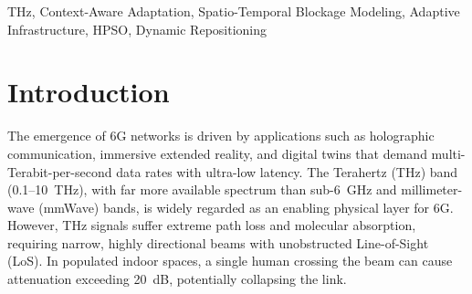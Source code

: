 \documentclass[conference]{IEEEtran}
\begin{document}
	\begin{abstract}
		The Terahertz (THz) band promises high-speed indoor
		connectivity for 6G, but its dependence on line-of-sight
		makes it highly vulnerable to dynamic blockages. Traditional indoor deployments rely on static Access Points (APs) and cannot adapt when physical obstructions arise
		or crowd patterns shift, leading to low coverage. In this
		paper, we present TeraMove, a blockage-aware framework that
		uses spatial human-density context to detect THz link degradation
		from dynamic blockages and adapt the AP configuration to restore
		pervasive connectivity. We describe how this context can be obtained from 3D LiDAR depth sensing; our evaluation uses an empirical pedestrian density model.
		TeraMove first establishes an optimal baseline layout for AP placement using a Mixed Integer Linear Programming (MILP) model over 3D
		coordinates and beam orientations, then employs a four-tier optimization that escalates from electronic beam steering to full 3D
		node repositioning, performing physical movement only when lighter
		adaptations prove insufficient to provide threshold coverage.
		Evaluations in a realistic indoor environment show that crowd-induced
		blockages can reduce coverage to 16.6\%; our algorithm recovers it
		to over 95\% while requiring 84.6\% less physical displacement than
		the alternative approaches evaluated.
	\end{abstract}
	
	\begin{IEEEkeywords}
		THz, Context-Aware Adaptation, Spatio-Temporal Blockage Modeling, Adaptive Infrastructure, HPSO, Dynamic Repositioning
	\end{IEEEkeywords}
	
	\section{Introduction}
	
	The emergence of 6G networks is driven by applications such as holographic communication, immersive extended reality, and digital twins that demand multi-Terabit-per-second data rates with ultra-low latency. The Terahertz (THz) band (0.1--10~THz), with far more available spectrum than sub-6~GHz and millimeter-wave (mmWave) bands, is widely regarded as an enabling physical layer for 6G. However, THz signals suffer extreme path loss and molecular absorption, requiring narrow, highly directional beams with unobstructed Line-of-Sight (LoS). In populated indoor spaces, a single human crossing the beam can cause attenuation exceeding 20~dB, potentially collapsing the link.
	
\end{document}
